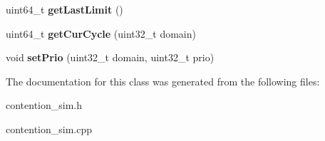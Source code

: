 \begin{DoxyCompactItemize}
\item 
\hypertarget{classContentionSim_ae9982a572df654edb1bf6a7f5f0d2197}{uint64\-\_\-t {\bfseries get\-Last\-Limit} ()}\label{classContentionSim_ae9982a572df654edb1bf6a7f5f0d2197}

\item 
\hypertarget{classContentionSim_a782a5b4f4f1d980cd781ef9b87c2c7c3}{uint64\-\_\-t {\bfseries get\-Cur\-Cycle} (uint32\-\_\-t domain)}\label{classContentionSim_a782a5b4f4f1d980cd781ef9b87c2c7c3}

\item 
\hypertarget{classContentionSim_aff58f59d88d745695f24441f08fc0eb8}{void {\bfseries set\-Prio} (uint32\-\_\-t domain, uint32\-\_\-t prio)}\label{classContentionSim_aff58f59d88d745695f24441f08fc0eb8}

\end{DoxyCompactItemize}


The documentation for this class was generated from the following files\-:\begin{DoxyCompactItemize}
\item 
contention\-\_\-sim.\-h\item 
contention\-\_\-sim.\-cpp\end{DoxyCompactItemize}
